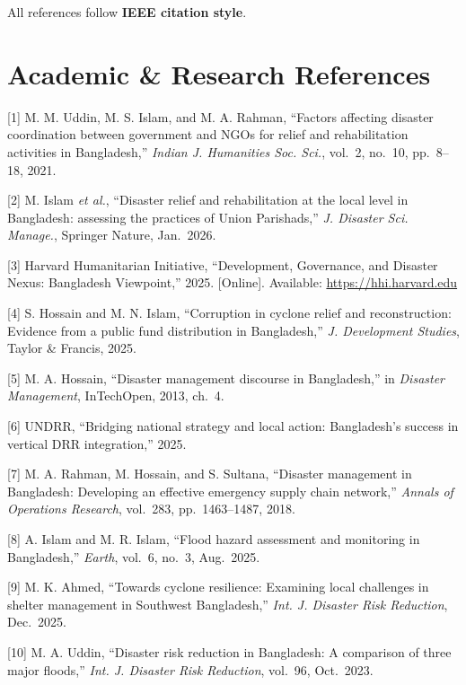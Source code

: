
All references follow \textbf{IEEE citation style}.

\section{Academic \& Research References}

[1] M. M. Uddin, M. S. Islam, and M. A. Rahman, ``Factors affecting disaster coordination between government and NGOs for relief and rehabilitation activities in Bangladesh,'' \textit{Indian J. Humanities Soc. Sci.}, vol.~2, no.~10, pp.~8--18, 2021.

[2] M. Islam \textit{et al.}, ``Disaster relief and rehabilitation at the local level in Bangladesh: assessing the practices of Union Parishads,'' \textit{J. Disaster Sci. Manage.}, Springer Nature, Jan.~2026.

[3] Harvard Humanitarian Initiative, ``Development, Governance, and Disaster Nexus: Bangladesh Viewpoint,'' 2025. [Online]. Available: \url{https://hhi.harvard.edu}

[4] S. Hossain and M. N. Islam, ``Corruption in cyclone relief and reconstruction: Evidence from a public fund distribution in Bangladesh,'' \textit{J. Development Studies}, Taylor \& Francis, 2025.

[5] M. A. Hossain, ``Disaster management discourse in Bangladesh,'' in \textit{Disaster Management}, InTechOpen, 2013, ch.~4.

[6] UNDRR, ``Bridging national strategy and local action: Bangladesh's success in vertical DRR integration,'' 2025.

[7] M. A. Rahman, M. Hossain, and S. Sultana, ``Disaster management in Bangladesh: Developing an effective emergency supply chain network,'' \textit{Annals of Operations Research}, vol.~283, pp.~1463--1487, 2018.

[8] A. Islam and M. R. Islam, ``Flood hazard assessment and monitoring in Bangladesh,'' \textit{Earth}, vol.~6, no.~3, Aug.~2025.

[9] M. K. Ahmed, ``Towards cyclone resilience: Examining local challenges in shelter management in Southwest Bangladesh,'' \textit{Int. J. Disaster Risk Reduction}, Dec.~2025.

[10] M. A. Uddin, ``Disaster risk reduction in Bangladesh: A comparison of three major floods,'' \textit{Int. J. Disaster Risk Reduction}, vol.~96, Oct.~2023.

